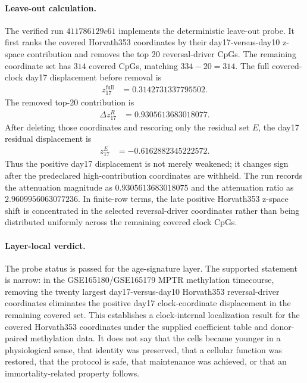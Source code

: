 \paragraph{Leave-out calculation.}
The verified run $411786129c61$ implements the deterministic leave-out probe.  It first ranks the covered Horvath353 coordinates by their day17-versus-day10 z-space contribution and removes the top $20$ reversal-driver CpGs.  The remaining coordinate set has $314$ covered CpGs, matching $334-20=314$.  The full covered-clock day17 displacement before removal is
$$
\begin{aligned}
z_{17}^{\mathrm{full}} &= 0.3142731337795502 .
\end{aligned}
$$
The removed top-$20$ contribution is
$$
\begin{aligned}
\Delta z_{17}^{R} &= 0.9305613683018077 .
\end{aligned}
$$
After deleting those coordinates and rescoring only the residual set $E$, the day17 residual displacement is
$$
\begin{aligned}
z_{17}^{E} &= -0.6162882345222572 .
\end{aligned}
$$
Thus the positive day17 displacement is not merely weakened; it changes sign after the predeclared high-contribution coordinates are withheld.  The run records the attenuation magnitude as $0.9305613683018075$ and the attenuation ratio as $2.9609956063077236$.  In finite-row terms, the late positive Horvath353 z-space shift is concentrated in the selected reversal-driver coordinates rather than being distributed uniformly across the remaining covered clock CpGs.

\paragraph{Layer-local verdict.}
The probe status is passed for the age-signature layer.  The supported statement is narrow: in the GSE165180/GSE165179 MPTR methylation timecourse, removing the twenty largest day17-versus-day10 Horvath353 reversal-driver coordinates eliminates the positive day17 clock-coordinate displacement in the remaining covered set.  This establishes a clock-internal localization result for the covered Horvath353 coordinates under the supplied coefficient table and donor-paired methylation data.  It does not say that the cells became younger in a physiological sense, that identity was preserved, that a cellular function was restored, that the protocol is safe, that maintenance was achieved, or that an immortality-related property follows.

